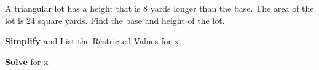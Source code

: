 \documentclass[11pt]{exam}
\begin{document}
\begin{questions}


\question[5] A triangular lot has a height that is 8 yards longer than the base.
The area of the lot is 24 square yards.
Find the base and height of the lot.
\vfill
\vfill

\newpage

\addpoints
\question \textbf{Simplify} and List the Restricted Values for x

\newpage

\addpoints
\question \textbf{Solve} for x
\end{questions}
\end{document}
